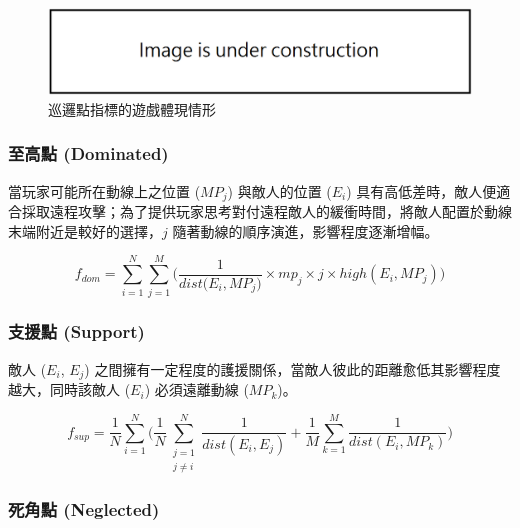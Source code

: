 \begin{figure}[ht]
  \begin{center}
    \includegraphics[width=1.0\textwidth]{figures/under_construction.png}
    \caption{巡邏點指標的遊戲體現情形}
    \label{fig:fitnesses-patrol-gameplay}
  \end{center}
\end{figure}

\subsubsection{至高點 (Dominated)}
\label{sssec:method-segments-fitnesses-dominated}

當玩家可能所在動線上之位置 ($MP_{j}$) 與敵人的位置 ($E_{i}$) 具有高低差時，敵人便適合採取遠程攻擊；為了提供玩家思考對付遠程敵人的緩衝時間，將敵人配置於動線末端附近是較好的選擇，$j$ 隨著動線的順序演進，影響程度逐漸增幅。

\begin{equation}
f_{dom}=\sum_{i=1}^{N} \sum_{j=1}^{M} \Big( \frac{1}{dist\big(E_{i}, MP_{j}\big)} \times mp_{j} \times j \times high(E_{i}, MP_{j}) \Big)
\end{equation}

\subsubsection{支援點 (Support)}
\label{sssec:method-segments-fitnesses-support}

敵人 ($E_{i}$, $E_{j}$) 之間擁有一定程度的護援關係，當敵人彼此的距離愈低其影響程度越大，同時該敵人 ($E_{i}$) 必須遠離動線 ($MP_{k}$)。

\begin{equation}
f_{sup}=\frac{1}{N} \sum_{i=1}^{N} \bigg( \frac{1}{N} \sum_{\substack{j=1 \\ j \neq i}}^{N} \frac{1}{dist(E_{i}, E_{j})} + \frac{1}{M} \sum_{k=1}^{M} \frac{1}{dist(E_{i}, MP_{k})} \bigg)
\end{equation}

\subsubsection{死角點 (Neglected)}
\label{sssec:method-segments-fitnesses-neglected}

